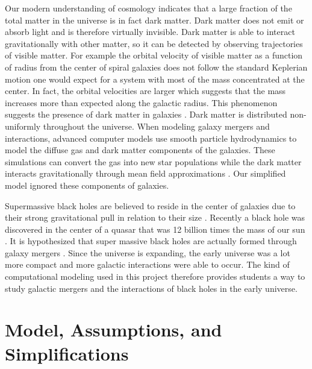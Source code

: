\documentclass[11pt]{article}
\begin{document}
Our modern understanding of cosmology indicates that a large fraction of the total matter in the universe is in fact dark matter.  Dark matter does not emit or absorb light and is therefore virtually invisible.  Dark matter is able to interact gravitationally with other matter, so it can be detected by observing trajectories of visible matter.  For example the orbital velocity of visible matter as a function of radius from the center of spiral galaxies does not follow the standard Keplerian motion one would expect for a system with most of the mass concentrated at the center.  In fact, the orbital velocities are larger which suggests that the mass increases more than expected along the galactic radius.  This phenomenon suggests the presence of dark matter in galaxies \cite{Freeman}. Dark matter is distributed non-uniformly throughout the universe. When modeling galaxy mergers and interactions, advanced computer models use smooth particle hydrodynamics to model the diffuse gas and dark matter components of the galaxies.  These simulations can convert the gas into new star populations while the dark matter interacts gravitationally through mean field approximations \cite{Chilingarian2010}.  Our simplified model ignored these components of galaxies.


Supermassive black holes are believed to reside in the center of galaxies due to their strong gravitational pull in relation to their size \cite{Madejski2003}.  Recently a black hole was discovered in the center of a quasar that was 12 billion times the mass of our sun \cite{Wu2015}.  It is hypothesized that super massive black holes are actually formed through galaxy mergers \cite{Mayer2007}.  Since the universe is expanding, the early universe was a lot more compact and more galactic interactions were able to occur. The kind of computational modeling used in this project therefore provides students a way to study galactic mergers and the interactions of black holes in the early universe.  

\section{Model, Assumptions, and Simplifications}\label{MAS_sec}
\end{document}
